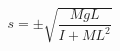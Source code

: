 \documentclass[preview]{standalone}
\begin{document}
\begin{align*}
s = \pm\sqrt{\dfrac{MgL}{I+ML^2}}
\end{align*}
\end{document}
